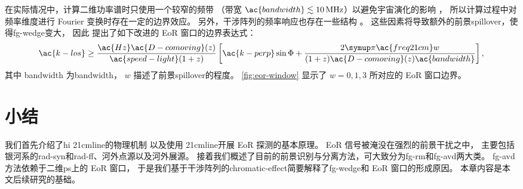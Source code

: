 在实际情况中，计算二维功率谱时只使用一个较窄的频带
（带宽 $\ac{bandwidth} \lesssim \SI{10}{\MHz}$）以避免宇宙演化的影响
\cite{wyithe2004,thyagarajan2013}，
所以计算过程中对频率维度进行 Fourier 变换时存在一定的边界效应。
另外，干涉阵列的频率响应也存在一些结构 \cite{deLeraAcedo2017,trott2017}。
这些因素将导致额外的前景\ac{spillover}，使得\ac{fg-wedge}变大，
因此  提出了如下改进的 EoR 窗口的边界表达式：
\begin{equation}
  \label{eq:eor-window}
  \ac{k-los} \ge
    \frac{\ac{Hz} \ac{D-comoving}(z)}{\ac{speed-light} (1+z)}
    \left[ \ac{k-perp} \sin\Phi
      + \frac{2\Cpi\ac{freq21cm} w}{(1+z) \ac{D-comoving}(z)
        \ac{bandwidth}} \right] ,
\end{equation}
其中 \ac{bandwidth} 为\acl{bandwidth}，
$w$ 描述了前景\ac{spillover}的程度。
\autoref{fig:eor-window} 显示了 $w = 0, 1, 3$ 所对应的 EoR 窗口边界。


\section{小结}

我们首先介绍了\ac{hi} \ac{21cmline}的物理机制
以及使用 \ac{21cmline}开展 EoR 探测的基本原理。
EoR 信号被淹没在强烈的前景干扰之中，
主要包括银河系的\ac{rad-syn}和\ac{rad-ff}、河外点源以及河外展源。
接着我们概述了目前的前景识别与分离方法，可大致分为\ac{fg-rm}和\ac{fg-avd}两大类。
\ac{fg-avd}方法依赖于二维\ac{ps}上的 EoR 窗口，
于是我们基于干涉阵列的\ac{chromatic-effect}简要解释了\ac{fg-wedge}和
EoR 窗口的形成原因。
本章内容是本文后续研究的基础。


